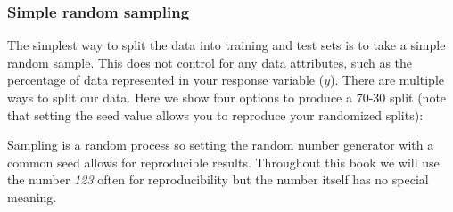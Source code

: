 \documentclass[]{book}
\newenvironment{Shaded}{\begin{snugshade}}{\end{snugshade}}
\newcommand{\CommentTok}[1]{\textcolor[rgb]{0.56,0.35,0.01}{\textit{#1}}}
\newcommand{\DataTypeTok}[1]{\textcolor[rgb]{0.13,0.29,0.53}{#1}}
\newcommand{\DecValTok}[1]{\textcolor[rgb]{0.00,0.00,0.81}{#1}}
\newcommand{\FloatTok}[1]{\textcolor[rgb]{0.00,0.00,0.81}{#1}}
\newcommand{\KeywordTok}[1]{\textcolor[rgb]{0.13,0.29,0.53}{\textbf{#1}}}
\newcommand{\NormalTok}[1]{#1}
\newcommand{\OperatorTok}[1]{\textcolor[rgb]{0.81,0.36,0.00}{\textbf{#1}}}
\newcommand{\OtherTok}[1]{\textcolor[rgb]{0.56,0.35,0.01}{#1}}
\newcommand{\StringTok}[1]{\textcolor[rgb]{0.31,0.60,0.02}{#1}}
\theoremstyle{definition}
\theoremstyle{definition}
\theoremstyle{definition}
\theoremstyle{remark}
\begin{document}
\hypertarget{simple-random-sampling}{%
\subsubsection{Simple random sampling}\label{simple-random-sampling}}

The simplest way to split the data into training and test sets is to
take a simple random sample. This does not control for any data
attributes, such as the percentage of data represented in your response
variable (\(y\)). There are multiple ways to split our data. Here we
show four options to produce a 70-30 split (note that setting the seed
value allows you to reproduce your randomized splits):

\begin{note}
Sampling is a random process so setting the random number generator with
a common seed allows for reproducible results. Throughout this book we
will use the number \emph{123} often for reproducibility but the number
itself has no special meaning.
\end{note}

\begin{Shaded}
\end{Shaded}
\end{document}

